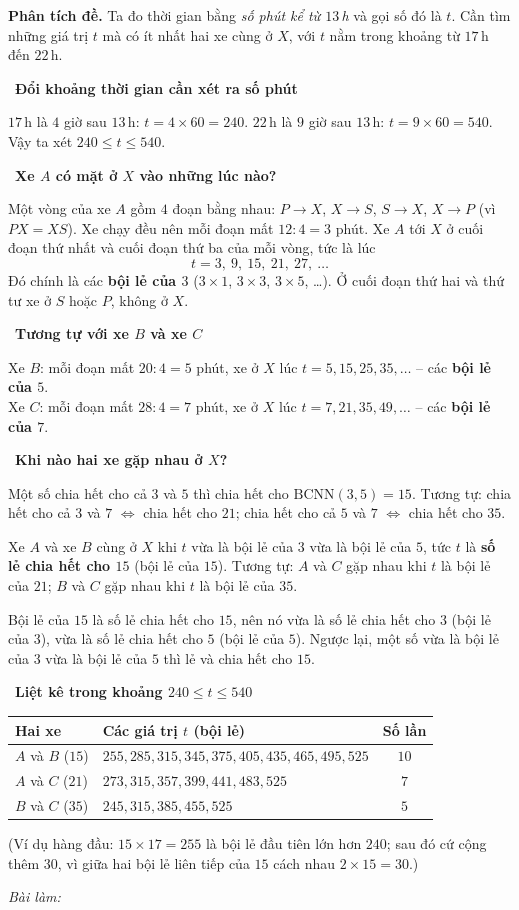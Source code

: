 \documentclass[11pt]{article}
\newif\ifsol \solfalse
\newcommand{\StuProb}[2]{\begin{probboxS}{#1}{#2}\StuProbBody\end{probboxS}}
\newcommand{\probsol}[1]{%
  \begin{lrbox}{\solmeasure}\begin{minipage}{\dimexpr\linewidth-24pt\relax}#1\end{minipage}\end{lrbox}%
  \ifsol
    \begin{solbox}#1\end{solbox}%
  \else
    \setlength{\solht}{\dimexpr\ht\solmeasure+\dp\solmeasure+0.85cm\relax}%
    \ifdim\solht<1.35cm\setlength{\solht}{1.35cm}\fi
    \ifdim\solht>\StudentMaxWork\setlength{\solht}{\StudentMaxWork}\fi
    \par\noindent\begin{minipage}{\linewidth}%
    \expandafter\StuProb\StuProbArgs
    \begin{tcolorbox}[colback=white,colframe=Line,boxrule=0.8pt,arc=5pt,
      left=8pt,right=8pt,top=4pt,bottom=4pt,height=\solht]{\footnotesize\color{Slate}\itshape\WorkWord}\end{tcolorbox}%
    \end{minipage}\par\medskip
  \fi}
\newlength{\StudentMaxWork}\setlength{\StudentMaxWork}{4.5cm}
\newcommand{\step}[2]{\par\smallskip\noindent{\bfseries\color{tmBlue!85!black}\StepWord~#1.}\ {\bfseries #2}\par\nopagebreak}
\def\WorkWord{Bài làm:}
\def\StepWord{Bước}
\begin{document}
\probsol{
\textbf{Phân tích đề.} Ta đo thời gian bằng \emph{số phút kể từ $13$\,h} và gọi số đó là $t$. Cần tìm
những giá trị $t$ mà có ít nhất hai xe cùng ở $X$, với $t$ nằm trong khoảng từ $17$\,h đến $22$\,h.

\step{1}{Đổi khoảng thời gian cần xét ra số phút}
$17$\,h là $4$ giờ sau $13$\,h: $t=4\times60=240$. \quad $22$\,h là $9$ giờ sau $13$\,h: $t=9\times60=540$.
Vậy ta xét $240\le t\le540$.

\step{2}{Xe $A$ có mặt ở $X$ vào những lúc nào?}
Một vòng của xe $A$ gồm $4$ đoạn bằng nhau: $P\to X$, $X\to S$, $S\to X$, $X\to P$ (vì $PX=XS$).
Xe chạy đều nên mỗi đoạn mất $12:4=3$ phút. Xe $A$ tới $X$ ở cuối đoạn thứ nhất và cuối đoạn thứ ba
của mỗi vòng, tức là lúc
\[t=3,\ 9,\ 15,\ 21,\ 27,\ \dots\]
Đó chính là các \textbf{bội lẻ của $3$} ($3\times1$, $3\times3$, $3\times5$, \dots). Ở cuối đoạn thứ hai và thứ tư
xe ở $S$ hoặc $P$, không ở $X$.

\step{3}{Tương tự với xe $B$ và xe $C$}
Xe $B$: mỗi đoạn mất $20:4=5$ phút, xe ở $X$ lúc $t=5,15,25,35,\dots$ -- các \textbf{bội lẻ của $5$}.\\
Xe $C$: mỗi đoạn mất $28:4=7$ phút, xe ở $X$ lúc $t=7,21,35,49,\dots$ -- các \textbf{bội lẻ của $7$}.

\step{4}{Khi nào hai xe gặp nhau ở $X$?}
\begin{recallbox}Một số chia hết cho cả $3$ và $5$ thì chia hết cho $\text{BCNN}(3,5)=15$. Tương tự:
chia hết cho cả $3$ và $7$ $\Leftrightarrow$ chia hết cho $21$; chia hết cho cả $5$ và $7$ $\Leftrightarrow$
chia hết cho $35$.\end{recallbox}
Xe $A$ và xe $B$ cùng ở $X$ khi $t$ vừa là bội lẻ của $3$ vừa là bội lẻ của $5$, tức $t$ là \textbf{số lẻ chia hết cho $15$}
(bội lẻ của $15$). Tương tự: $A$ và $C$ gặp nhau khi $t$ là bội lẻ của $21$; $B$ và $C$ gặp nhau khi $t$ là bội lẻ của $35$.
\begin{proofbox}Bội lẻ của $15$ là số lẻ chia hết cho $15$, nên nó vừa là số lẻ chia hết cho $3$ (bội lẻ của $3$), vừa là
số lẻ chia hết cho $5$ (bội lẻ của $5$). Ngược lại, một số vừa là bội lẻ của $3$ vừa là bội lẻ của $5$ thì lẻ và chia
hết cho $15$.\end{proofbox}

\step{5}{Liệt kê trong khoảng $240\le t\le540$}
\begin{center}\begin{tabular}{|l|l|c|}\hline
Hai xe & Các giá trị $t$ (bội lẻ) & Số lần\\\hline
$A$ và $B$ ($15$) & $255, 285, 315, 345, 375, 405, 435, 465, 495, 525$ & $10$\\\hline
$A$ và $C$ ($21$) & $273, 315, 357, 399, 441, 483, 525$ & $7$\\\hline
$B$ và $C$ ($35$) & $245, 315, 385, 455, 525$ & $5$\\\hline
\end{tabular}\end{center}
(Ví dụ hàng đầu: $15\times17=255$ là bội lẻ đầu tiên lớn hơn $240$; sau đó cứ cộng thêm $30$, vì giữa hai
bội lẻ liên tiếp của $15$ cách nhau $2\times15=30$.)

}
\end{document}
